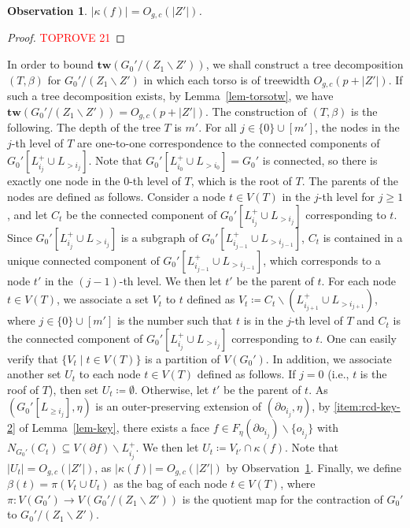 \documentclass[a4paper,11pt]{article}
\numberwithin{lemma}{section}
\newtheorem{observation}[lemma]{Observation}
\newcommand{\tw}{\mathbf{tw}}
\begin{document}
\begin{observation} \label{obs-kappa}
$|\kappa(f)| = O_{g,c}(|Z'|)$.
\end{observation}
\begin{proof}\textcolor{red}{TOPROVE 21}\end{proof}

In order to bound $\tw(G_0'/(Z_1 \backslash Z'))$, we shall construct a tree decomposition $(T,\beta)$ for $G_0'/(Z_1 \backslash Z')$ in which each torso is of treewidth $O_{g,c}(p+|Z'|)$.
If such a tree decomposition exists, by Lemma~\ref{lem-torsotw}, we have $\tw(G_0'/(Z_1 \backslash Z')) = O_{g,c}(p+|Z'|)$.
The construction of $(T,\beta)$ is the following.
The depth of the tree $T$ is $m'$.
For all $j \in \{0\} \cup [m']$, the nodes in the $j$-th level of $T$ are one-to-one correspondence to the connected components of $G_0'[L_{i_j}^+ \cup L_{> i_j}]$.
Note that $G_0'[L_{i_0}^+ \cup L_{> i_0}] = G_0'$ is connected, so there is exactly one node in the $0$-th level of $T$, which is the root of $T$.
The parents of the nodes are defined as follows.
Consider a node $t \in V(T)$ in the $j$-th level for $j \geq 1$, and let $C_t$ be the connected component of $G_0'[L_{i_j}^+ \cup L_{> i_j}]$ corresponding to $t$.
Since $G_0'[L_{i_j}^+ \cup L_{> i_j}]$ is a subgraph of $G_0'[L_{i_{j-1}}^+ \cup L_{> i_{j-1}}]$, $C_t$ is contained in a unique connected component of $G_0'[L_{i_{j-1}}^+ \cup L_{> i_{j-1}}]$, which corresponds to a node $t'$ in the $(j-1)$-th level.
We then let $t'$ be the parent of $t$.
For each node $t \in V(T)$, we associate a set $V_t$ to $t$ defined as $V_t \coloneqq C_t \backslash (L_{i_{j+1}}^+ \cup L_{> i_{j+1}})$, where $j \in \{0\} \cup [m']$ is the number such that $t$ is in the $j$-th level of $T$ and $C_t$ is the connected component of $G_0'[L_{i_j}^+ \cup L_{> i_j}]$ corresponding to $t$.
One can easily verify that $\{V_t \mid t \in V(T)\}$ is a partition of $V(G_0')$.
In addition, we associate another set $U_t$ to each node $t \in V(T)$ defined as follows.
If $j = 0$ (i.e., $t$ is the roof of $T$), then set $U_t \coloneqq \emptyset$.
Otherwise, let $t'$ be the parent of $t$.
As $(G_0'[L_{\geq i_j}],\eta)$ is an outer-preserving extension of $(\partial o_{i_j},\eta)$, by \ref{item:rcd-key-2} of Lemma~\ref{lem-key}, there exists a face $f \in F_\eta(\partial o_{i_j}) \backslash \{o_{i_j}\}$ with $N_{G_0'}(C_t) \subseteq V(\partial f) \backslash L_{i_j}^+$.
We then let $U_t \coloneqq V_{t'} \cap \kappa(f)$.
Note that $|U_t| = O_{g,c}(|Z'|)$, as $|\kappa(f)| = O_{g,c}(|Z'|)$ by Observation~\ref{obs-kappa}.
Finally, we define $\beta(t) = \pi(V_t \cup U_t)$ as the bag of each node $t \in V(T)$, where $\pi: V(G_0') \rightarrow V(G_0'/(Z_1 \backslash Z'))$ is the quotient map for the contraction of $G_0'$ to $G_0'/(Z_1 \backslash Z')$.
\end{document}
